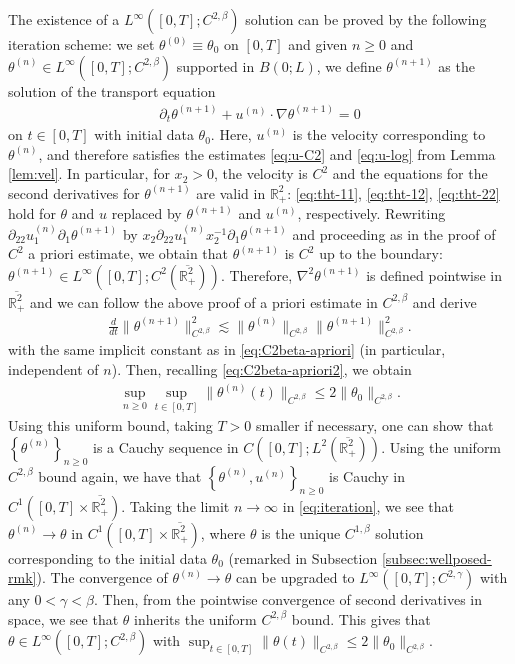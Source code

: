 \documentclass[10pt]{amsart}
\theoremstyle{definition}
\theoremstyle{remark}
\numberwithin{equation}{section}
\newcommand{\rd}{\partial}
\newcommand{\nb}{\nabla}
\newcommand{\0}{\emptyset}
\newcommand{\ohp}{\overline{\bbR^2_+}}
\newcommand{\bt}{\beta}
\newcommand{\gmm}{\gamma}
\newcommand{\tht}{\theta}
\newcommand{\bbR}{\mathbb R}
\begin{document}
			The existence of a $L^{\infty}([0,T];C^{2,\bt})$ solution can be proved by the following iteration scheme: we set $\tht^{(0)} \equiv \tht_{0}$ on $[0,T]$ and given $n\ge 0$ and $\tht^{(n)} \in L^{\infty}([0,T];C^{2,\bt})$ supported in $B(0;L)$, we define $\tht^{(n+1)}$ as the solution of the transport equation \begin{equation}\label{eq:iteration}
				\begin{split}
					\rd_{t} \tht^{(n+1)} + u^{(n)}\cdot\nb \tht^{(n+1)} = 0 
				\end{split}
			\end{equation} on $t \in [0,T]$ with initial data $\tht_{0}$. Here, $u^{(n)}$ is the velocity corresponding to $\tht^{(n)}$, and therefore satisfies the estimates \eqref{eq:u-C2} and \eqref{eq:u-log} from Lemma \ref{lem:vel}. In particular, for $x_{2}>0$, the velocity is $C^{2}$ and the equations for the second derivatives for $\tht^{(n+1)}$ are valid in $\bbR^{2}_{+}$: \eqref{eq:tht-11}, \eqref{eq:tht-12}, \eqref{eq:tht-22} hold for $\tht$ and $u$ replaced by $\tht^{(n+1)}$ and $u^{(n)}$, respectively. Rewriting $\rd_{22}u_{1}^{(n)} \rd_{1}\tht^{(n+1)} $ by $x_{2}\rd_{22}u_{1}^{(n)} x_{2}^{-1}\rd_{1}\tht^{(n+1)} $ and proceeding as in the proof of $C^{2}$ a priori estimate, we obtain that $\tht^{(n+1)}$ is $C^{2}$ up to the boundary: $\tht^{(n+1)} \in L^\infty([0,T];C^{2}(\ohp))$. Therefore, $\nb^2 \tht^{(n+1)}$ is defined pointwise in $\ohp$ and we can follow the above proof of a priori estimate in $C^{2,\bt}$ and derive \begin{equation*}
				\begin{split}
					\frac{d}{dt} \| \tht^{(n+1)} \|_{C^{2,\beta}}^2 \lesssim \| \tht^{(n)} \|_{C^{2,\beta}} \| \tht^{(n+1)} \|_{C^{2,\beta}}^2.
				\end{split}
			\end{equation*} with the same implicit constant as in \eqref{eq:C2beta-apriori} (in particular, independent of $n$). Then, recalling \eqref{eq:C2beta-apriori2}, we obtain \begin{equation*}
				\begin{split}
					\sup_{n\ge0}	\sup_{ t \in [0,T] }\| \tht^{(n)}(t) \|_{C^{2,\beta}} \le 2\| \tht_{0} \|_{C^{2,\beta}}.
				\end{split}
			\end{equation*} Using this uniform bound, taking $T>0$ smaller if necessary, one can show that  $\left\{ \tht^{(n)} \right\}_{n\ge0}$ is a Cauchy sequence in $C([0,T];L^2(\ohp))$. Using the uniform $C^{2,\bt}$ bound again, we have that $\left\{ \tht^{(n)}, u^{(n)} \right\}_{n\ge0}$ is Cauchy in $C^{1}([0,T]\times \ohp)$. Taking the limit $n\to\infty$ in \eqref{eq:iteration}, we see that $\tht^{(n)}\to \tht$ in $C^{1}([0,T]\times \ohp)$, where $\tht$ is the unique $C^{1,\bt}$ solution corresponding to the initial data $\tht_{0}$ (remarked in Subsection \ref{subsec:wellposed-rmk}). The convergence of $\tht^{(n)}\to \tht$  can be upgraded to $L^{\infty}([0,T];C^{2,\gmm})$ with any $0<\gmm<\bt$. Then, from the pointwise convergence of second derivatives in space, we see that $\tht$ inherits the uniform $C^{2,\bt}$ bound. This gives that $\tht \in L^{\infty}([0,T];C^{2,\bt})$ with $\sup_{ t \in [0,T] }\| \tht(t) \|_{C^{2,\beta}} \le 2\| \tht_{0} \|_{C^{2,\beta}}.$
\end{document}
